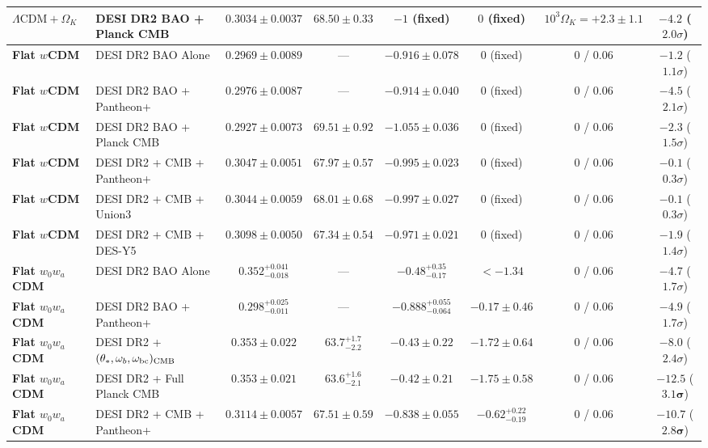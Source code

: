 \documentclass[11pt,letterpaper]{article}
\begin{document}
\begin{table}[!htbp]
{\begin{tabular}{llcccccc}
\textbf{$\Lambda\text{CDM} + \Omega_K$} & DESI DR2 BAO + Planck CMB & $0.3034 \pm 0.0037$ & $68.50 \pm 0.33$ & $-1$ (fixed) & $0$ (fixed) & $10^3\Omega_K = +2.3 \pm 1.1$ & $-4.2$ ($2.0\sigma$) \\
\midrule
\textbf{Flat $w$CDM} & DESI DR2 BAO Alone & $0.2969 \pm 0.0089$ & --- & $-0.916 \pm 0.078$ & $0$ (fixed) & $0$ / $0.06$ & $-1.2$ ($1.1\sigma$) \\
\textbf{Flat $w$CDM} & DESI DR2 BAO + Pantheon+ & $0.2976 \pm 0.0087$ & --- & $-0.914 \pm 0.040$ & $0$ (fixed) & $0$ / $0.06$ & $-4.5$ ($2.1\sigma$) \\
\textbf{Flat $w$CDM} & DESI DR2 BAO + Planck CMB & $0.2927 \pm 0.0073$ & $69.51 \pm 0.92$ & $-1.055 \pm 0.036$ & $0$ (fixed) & $0$ / $0.06$ & $-2.3$ ($1.5\sigma$) \\
\textbf{Flat $w$CDM} & DESI DR2 + CMB + Pantheon+ & $0.3047 \pm 0.0051$ & $67.97 \pm 0.57$ & $-0.995 \pm 0.023$ & $0$ (fixed) & $0$ / $0.06$ & $-0.1$ ($0.3\sigma$) \\
\textbf{Flat $w$CDM} & DESI DR2 + CMB + Union3 & $0.3044 \pm 0.0059$ & $68.01 \pm 0.68$ & $-0.997 \pm 0.027$ & $0$ (fixed) & $0$ / $0.06$ & $-0.1$ ($0.3\sigma$) \\
\textbf{Flat $w$CDM} & DESI DR2 + CMB + DES-Y5 & $0.3098 \pm 0.0050$ & $67.34 \pm 0.54$ & $-0.971 \pm 0.021$ & $0$ (fixed) & $0$ / $0.06$ & $-1.9$ ($1.4\sigma$) \\
\midrule
\textbf{Flat $w_0 w_a$CDM} & DESI DR2 BAO Alone & $0.352^{+0.041}_{-0.018}$ & --- & $-0.48^{+0.35}_{-0.17}$ & $< -1.34$ & $0$ / $0.06$ & $-4.7$ ($1.7\sigma$) \\
\textbf{Flat $w_0 w_a$CDM} & DESI DR2 BAO + Pantheon+ & $0.298^{+0.025}_{-0.011}$ & --- & $-0.888^{+0.055}_{-0.064}$ & $-0.17 \pm 0.46$ & $0$ / $0.06$ & $-4.9$ ($1.7\sigma$) \\
\textbf{Flat $w_0 w_a$CDM} & DESI DR2 + $(\theta_*,\omega_b,\omega_{\rm bc})_{\rm CMB}$ & $0.353 \pm 0.022$ & $63.7^{+1.7}_{-2.2}$ & $-0.43 \pm 0.22$ & $-1.72 \pm 0.64$ & $0$ / $0.06$ & $-8.0$ ($2.4\sigma$) \\
\textbf{Flat $w_0 w_a$CDM} & DESI DR2 + Full Planck CMB & $0.353 \pm 0.021$ & $63.6^{+1.6}_{-2.1}$ & $-0.42 \pm 0.21$ & $-1.75 \pm 0.58$ & $0$ / $0.06$ & $-12.5$ ($\mathbf{3.1}\boldsymbol{\sigma}$) \\
\textbf{Flat $w_0 w_a$CDM} & DESI DR2 + CMB + Pantheon+ & $0.3114 \pm 0.0057$ & $67.51 \pm 0.59$ & $-0.838 \pm 0.055$ & $-0.62^{+0.22}_{-0.19}$ & $0$ / $0.06$ & $-10.7$ ($\mathbf{2.8}\boldsymbol{\sigma}$) \\

\end{tabular}}
\end{table}
\end{document}
